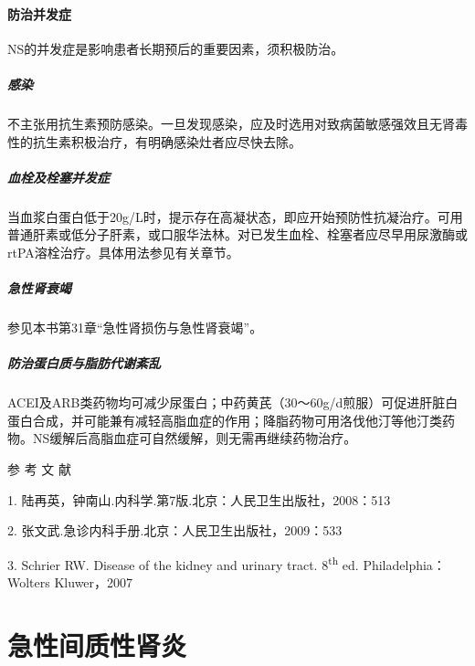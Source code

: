 \subsubsection{防治并发症}

NS的并发症是影响患者长期预后的重要因素，须积极防治。

\paragraph{感染}

不主张用抗生素预防感染。一旦发现感染，应及时选用对致病菌敏感强效且无肾毒性的抗生素积极治疗，有明确感染灶者应尽快去除。

\paragraph{血栓及栓塞并发症}

当血浆白蛋白低于20g/L时，提示存在高凝状态，即应开始预防性抗凝治疗。可用普通肝素或低分子肝素，或口服华法林。对已发生血栓、栓塞者应尽早用尿激酶或rtPA溶栓治疗。具体用法参见有关章节。

\paragraph{急性肾衰竭}

参见本书第31章“急性肾损伤与急性肾衰竭”。

\paragraph{防治蛋白质与脂肪代谢紊乱}

ACEI及ARB类药物均可减少尿蛋白；中药黄芪（30～60g/d煎服）可促进肝脏白蛋白合成，并可能兼有减轻高脂血症的作用；降脂药物可用洛伐他汀等他汀类药物。NS缓解后高脂血症可自然缓解，则无需再继续药物治疗。

\protect\hypertarget{text00342.html}{}{}

\hypertarget{text00342.htmlux5cux23CHP13-3-4}{}
参 考 文 献

1. 陆再英，钟南山.内科学.第7版.北京：人民卫生出版社，2008：513

2. 张文武.急诊内科手册.北京：人民卫生出版社，2009：533

3. Schrier RW. Disease of the kidney and urinary tract.
8\textsuperscript{th} ed. Philadelphia：Wolters Kluwer，2007

\protect\hypertarget{text00343.html}{}{}

\chapter{急性间质性肾炎}

